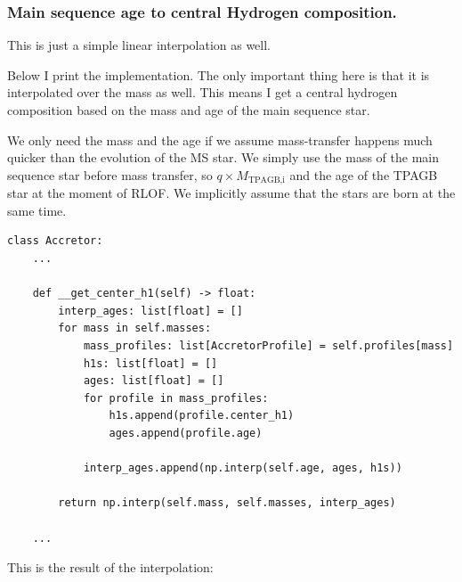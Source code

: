 \documentclass[a4paper,10pt]{article}
\begin{document}
\subsubsection{Main sequence age to central Hydrogen composition.}

This is just a simple linear interpolation as well.

Below I print the implementation. The only important thing here is that
it is interpolated over the mass as well. This means I get a central hydrogen
composition based on the mass and age of the main sequence star.

We only need the mass and the age if we assume mass-transfer happens
much quicker than the evolution of the MS star.
We simply use the mass of the main sequence star before mass transfer, so \(q\times M_\text{TPAGB,i}\) and the age of the
TPAGB star at the moment of RLOF. We implicitly assume that the stars are born at the same time.


\begin{verbatim}
class Accretor:
    ...

    def __get_center_h1(self) -> float:
        interp_ages: list[float] = []
        for mass in self.masses:
            mass_profiles: list[AccretorProfile] = self.profiles[mass]
            h1s: list[float] = []
            ages: list[float] = []
            for profile in mass_profiles:
                h1s.append(profile.center_h1)
                ages.append(profile.age)

            interp_ages.append(np.interp(self.age, ages, h1s))

        return np.interp(self.mass, self.masses, interp_ages)
    
    ...
\end{verbatim}

This is the result of the interpolation:
\begin{figure}[ht]
    \centering
\end{figure}
\end{document}
